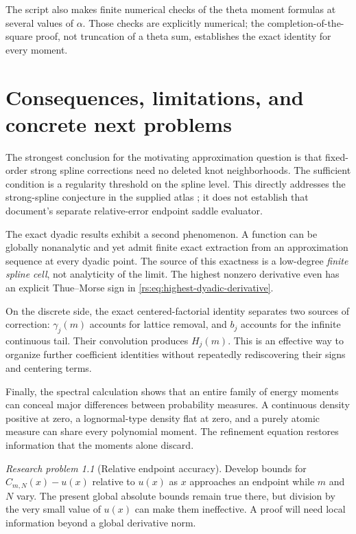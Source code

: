 \documentclass[11pt,a4paper,oneside,openany]{book}
\numberwithin{equation}{chapter}
\theoremstyle{definition}
\theoremstyle{remark}
\newtheorem{problem}[theorem]{Research problem}
\begin{document}
The script also makes finite numerical checks of the theta moment
formulas at several values of $\alpha$. Those checks are explicitly
numerical; the completion-of-the-square proof, not truncation of a
theta sum, establishes the exact identity for every moment.
\chapter{Consequences, limitations, and concrete next problems}\label{rs:sec:frontiers}

The strongest conclusion for the motivating approximation question
is that fixed-order strong spline corrections need no deleted knot
neighborhoods. The sufficient condition is a regularity threshold
on the spline level. This directly addresses the strong-spline
conjecture in the supplied atlas \cite{atlas}; it does not establish
that document's separate relative-error endpoint saddle evaluator.

The exact dyadic results exhibit a second phenomenon. A function
can be globally nonanalytic and yet admit finite exact extraction
from an approximation sequence at every dyadic point. The source
of this exactness is a low-degree \emph{finite spline cell}, not
analyticity of the limit. The highest nonzero derivative even has
an explicit Thue--Morse sign in
\eqref{rs:eq:highest-dyadic-derivative}.

On the discrete side, the exact centered-factorial identity
separates two sources of correction: $\gamma_j(m)$ accounts for
lattice removal, and $b_j$ accounts for the infinite continuous
tail. Their convolution produces $H_j(m)$. This is an effective
way to organize further coefficient identities without repeatedly
rediscovering their signs and centering terms.

Finally, the spectral calculation shows that an entire family of
energy moments can conceal major differences between probability
measures. A continuous density positive at zero, a lognormal-type
density flat at zero, and a purely atomic measure can share every
polynomial moment. The refinement equation restores information
that the moments alone discard.

\begin{problem}[Relative endpoint accuracy]
Develop bounds for $C_{m,N}(x)-u(x)$ relative to $u(x)$ as $x$
approaches an endpoint while $m$ and $N$ vary. The present global
absolute bounds remain true there, but division by the very small
value of $u(x)$ can make them ineffective. A proof will need local
information beyond a global derivative norm.
\end{problem}
\end{document}
